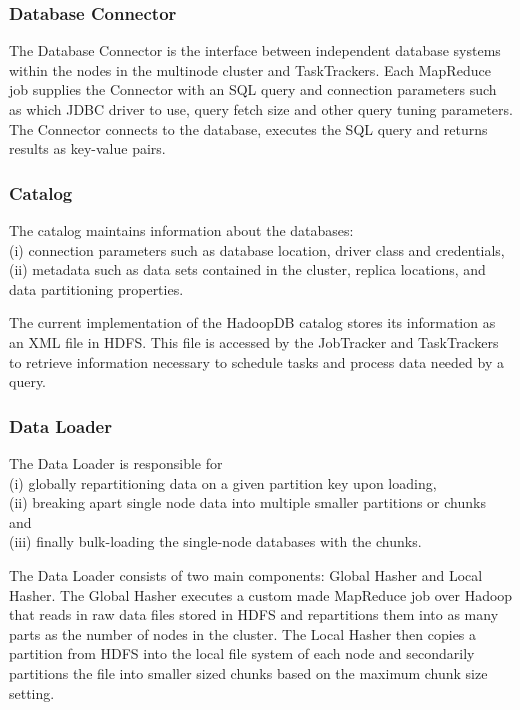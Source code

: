 \documentclass[9pt,twocolumn,twoside]{styles/osajnl}
\begin{document}
\subsubsection{Database Connector}
The Database Connector is the interface between independent database systems within the nodes in the multinode cluster and TaskTrackers. Each MapReduce job supplies the Connector with an SQL query and connection parameters such as which JDBC driver to use, query fetch size and other query tuning parameters. The Connector connects to the database, executes the SQL query and returns results as key-value pairs.

\subsubsection{Catalog}
The catalog maintains information about the databases:
\\(i) connection parameters such as database
location, driver class and credentials, 
\\(ii) metadata such as data sets contained in the cluster, replica locations, and data partitioning properties.

The current implementation of the HadoopDB catalog stores its information as an XML file in HDFS. This file is accessed by the JobTracker and TaskTrackers to retrieve information necessary
to schedule tasks and process data needed by a query.

\subsubsection{Data Loader}
The Data Loader is responsible for 
\\(i) globally repartitioning data on a given partition key upon loading, 
\\(ii) breaking apart single node data into multiple smaller partitions or chunks and 
\\(iii) finally bulk-loading the single-node databases with the chunks.

The Data Loader consists of two main components: Global Hasher and Local Hasher. The Global Hasher executes a custom made MapReduce job over Hadoop that reads in raw data files stored in HDFS and repartitions them into as many parts as the
number of nodes in the cluster. The Local Hasher then copies a partition from HDFS into the
local file system of each node and secondarily partitions the file into smaller sized chunks based on the maximum chunk size setting.
\end{document}
